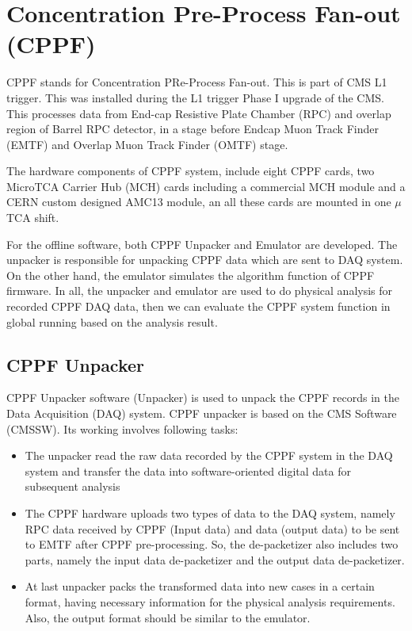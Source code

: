 \chapter{Concentration Pre-Process Fan-out (CPPF)}

CPPF stands for Concentration PRe-Process Fan-out. This is part of CMS L1 trigger. This was installed during the L1 trigger Phase I upgrade of the CMS. This processes data from End-cap Resistive Plate Chamber (RPC) and overlap region of Barrel RPC detector, in a stage before Endcap Muon Track Finder (EMTF) and Overlap Muon Track Finder (OMTF) stage.

The hardware components of CPPF system, include eight CPPF cards, two MicroTCA Carrier Hub (MCH) cards including a commercial MCH module and a CERN custom designed AMC13 module, an all these cards are mounted in one $\mu$TCA shift.

For the offline software, both CPPF Unpacker and Emulator are developed. The unpacker is responsible for unpacking CPPF data which are sent to DAQ system. On the other hand, the emulator simulates the algorithm function of CPPF firmware. In all, the unpacker and emulator are used to do physical analysis for recorded CPPF DAQ data, then we can evaluate the CPPF system function in global running based on the analysis result.

\section{CPPF Unpacker}
CPPF Unpacker software (Unpacker) is used to unpack the CPPF records in the Data Acquisition (DAQ) system.
CPPF unpacker is based on the CMS Software (CMSSW). Its working involves following tasks:
\begin{itemize}
    \item The unpacker read the raw data recorded by the CPPF system in the DAQ system and transfer the data into software-oriented digital data for subsequent analysis
    \item The CPPF hardware uploads two types of data to the DAQ system, namely RPC data received by CPPF (Input data) and data (output data) to be sent to EMTF after CPPF pre-processing. So, the de-packetizer also includes two parts, namely the input data de-packetizer and the output data de-packetizer.
    \item At last unpacker packs the transformed data into new cases in a certain format, having necessary information for the physical analysis requirements. Also, the output format should be similar to the emulator.
\end{itemize}

